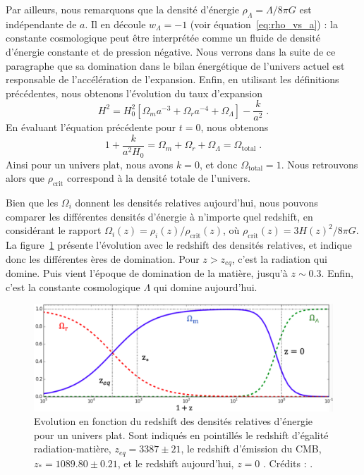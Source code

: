 Par ailleurs, nous remarquons que la densité d'énergie $\rho_{\Lambda} = \Lambda / 8 \pi G$ est indépendante de $a$. Il en découle $w_{\Lambda} = -1$ (voir équation~\ref{eq:rho_vs_a}) : la constante cosmologique peut être interprétée comme un fluide de densité d'énergie constante et de pression négative. Nous verrons dans la suite de ce paragraphe que sa domination dans le bilan énergétique de l'univers actuel est responsable de l'accélération de l'expansion.
Enfin, en utilisant les définitions précédentes, nous obtenons l'évolution du taux d'expansion
\begin{equation}
  \label{eq:friedmann7}
  H^2 = H_0^2 \left[\Omega_m a^{-3} + \Omega_r a^{-4} + \Omega_{\Lambda} \right] - \frac{k}{a^{2}}  \; .
\end{equation}
En évaluant l'équation précédente pour $t=0$, nous obtenons
\begin{equation}
  \label{eq:sum_omega}
 1 + \frac{k}{a^{2} H_{0}}  =  \Omega_m + \Omega_r + \Omega_{\Lambda} = \Omega_{\mathrm{total}}  \; .
\end{equation}
Ainsi pour un univers plat, nous avons $k = 0$, et donc $\Omega_{\mathrm{total}} = 1$. Nous retrouvons alors que $\rho_{\mathrm{crit}}$ correspond à la densité totale de l'univers. 

Bien que les $\Omega_i$ donnent les densités relatives aujourd'hui, nous pouvons comparer les différentes densités d'énergie à n'importe quel redshift, en considérant le rapport $\Omega_{i}(z) = \rho_{i}(z) / \rho_{\mathrm{crit}}(z)$, où $\rho_{\mathrm{crit}}(z) = 3H(z)^{2} / 8 \pi G$. La figure~\ref{fig:evol_omega} présente l'évolution  avec le redshift des densités relatives, et indique donc les différentes ères de domination. Pour $z > z_{eq}$, c'est la radiation qui domine. Puis vient l'époque de domination de la matière, jusqu'à $z \sim \num{0.3}$. Enfin, c'est la constante cosmologique $\Lambda$ qui domine aujourd'hui.
\begin{figure}
  \centering
  \includegraphics[scale=0.4]{evol_omega}
  \caption{Evolution en fonction du redshift des densités relatives d'énergie pour un univers plat. Sont indiqués en pointillés le redshift d'égalité radiation-matière, $z_{eq} = 3387 \pm 21$, le redshift d'émission du CMB, $z_{\ast} = \num{1089.80} \pm \num{0.21}$, et le redshift aujourd'hui, $z = 0$ \autocite{Collaboration2018}. Crédits : \textcite{Zarrouk2018a}.}
\label{fig:evol_omega}
\end{figure}

